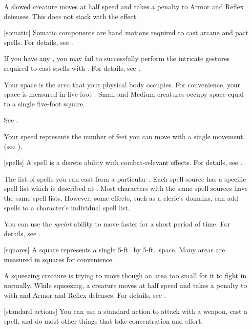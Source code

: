  A slowed creature moves at half speed and takes a  penalty to Armor and Reflex defenses.
This does not stack with the  effect.

[somatic] Somatic components are hand motions required to cast arcane and pact spells.
For details, see .

 If you have any , you may fail to successfully perform the intricate gestures required to cast spells with .
For details, see .

 Your space is the area that your physical body occupies.
For convenience, your space is measured in five-foot .
Small and Medium creatures occupy space equal to a single five-foot square.

 See .

 Your speed represents the number of feet you can move with a single movement (see ).

[spells] A spell is a disrete  ability with combat-relevant effects.
For details, see .

 The list of spells you can cast from a particular .
Each spell source has a specific spell list which is described at .
Most characters with the same spell sources have the same spell lists.
However, some effects, such as a cleric's domains, can add spells to a character's individual spell list.

 You can use the \textit{sprint} ability to move faster for a short period of time.
For details, see .

[squares] A square represents a single 5-ft.\ by 5-ft.\ space.
Many areas are measured in squares for convenience.

 A squeezing creature is trying to move though an area too small for it to fight in normally.
While squeezing, a creature moves at half speed and takes a  penalty to  with  and Armor and Reflex defenses.
For details, see .

[standard actions] You can use a standard action to attack with a weapon, cast a spell, and do most other things that take concentration and effort.


